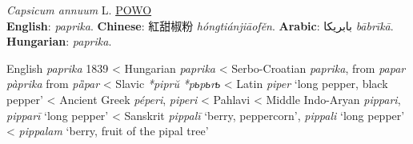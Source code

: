 
















\begin{spice}
\textit{Capsicum annuum} L. \hfill
\href{https://powo.science.kew.org/taxon/316944-2}{POWO}
\smallskip \\
\textbf{English}: \textit{paprika}.
\textbf{Chinese}: 紅甜椒粉 \textit{hóngtiánjiāofěn}.
\textbf{Arabic}: بابريكا \textit{bābrīkā}.
\textbf{Hungarian}: \textit{paprika}.
\end{spice}

\begin{etymology}
English \textit{paprika} 1839 
< Hungarian \textit{paprika} 
< Serbo-Croatian \textit{paprika}, from \textit{papar}  \textit{pàprika} from \textit{pȁpar} 
< Slavic \textit{*piprŭ}  \textit{*pьpьrь} 
< Latin  \textit{piper}  `long pepper, black pepper' 
< Ancient Greek \textit{péperi},  \textit{piperi} 
< Pahlavi 
< Middle Indo-Aryan  \textit{pippari},  \textit{pipparī} `long pepper' 
< Sanskrit \textit{pippalī}  `berry, peppercorn',  \textit{pippali} `long pepper' 
< \textit{pippalam} `berry, fruit of the pipal tree' 
\end{etymology}




